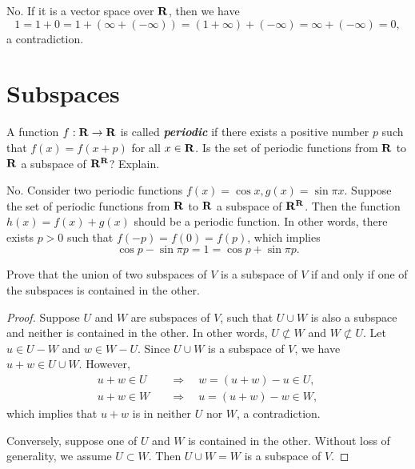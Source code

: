 \begin{solution}
	No. If it is a vector space over \( \mathbf{R} \), then we have
	\[
		1 = 1 + 0 = 1 + (\infty + (-\infty)) = (1 + \infty) + (-\infty) = \infty + (-\infty) = 0,
	\]
	a contradiction.
\end{solution}



\section{Subspaces}

\begin{exercise}{9}
A function \( f: \mathbf{R} \to \mathbf{R} \) is called \textbf{\textit{periodic}} if there exists a positive number \( p \) such that \( f(x) = f(x + p) \) for all \( x \in \mathbf{R} \). Is the set of periodic functions from \( \mathbf{R} \) to \( \mathbf{R} \) a subspace of \( \mathbf{R}^{\mathbf{R}} \)? Explain.
\end{exercise}

\begin{solution}
	No. Consider two periodic functions \( f(x) = \cos x, g(x) = \sin\pi x \). Suppose the set of periodic functions from \( \mathbf{R} \) to \( \mathbf{R} \) a subspace of \( \mathbf{R}^{\mathbf{R}} \). Then the function \( h(x) = f(x) + g(x) \) should be a periodic function. In other words, there exists \( p > 0 \) such that \( f(-p) = f(0) = f(p) \), which implies
	\[
		\cos p - \sin\pi p = 1 = \cos p + \sin\pi p.
	\]
\end{solution}

\begin{exercise}{12}
	Prove that the union of two subspaces of \( V \) is a subspace of \( V \) if and only if one of the subspaces is contained in the other.
\end{exercise}

\begin{proof}
	Suppose \( U \) and \( W \) are subspaces of \( V \), such that \( U \cup W \) is also a subspace and neither is contained in the other. In other words, \( U \not\subset W \) and \( W \not\subset U \). Let \( u \in U - W \) and \( w \in W - U \). Since \( U \cup W \) is a subspace of \( V \), we have \( u + w \in U \cup W \). However,
	\begin{align*}
		u + w \in U \quad &\Rightarrow \quad w = (u + w) - u \in U, \\
		u + w \in W \quad &\Rightarrow \quad u = (u + w) - w \in W,
	\end{align*}
	which implies that \( u + w \) is in neither \( U \) nor \( W \), a contradiction.

	Conversely, suppose one of \( U \) and \( W \) is contained in the other. Without loss of generality, we assume \( U \subset W \). Then \( U \cup W = W \) is a subspace of \( V \).
\end{proof}

